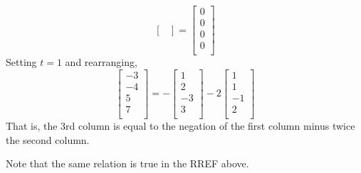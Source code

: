 \documentclass{article}
\begin{document}
\begin{example}
\[\begin{bmatrix}
      \end{bmatrix} =
      \begin{bmatrix}
        0\\0\\0\\0\\
      \end{bmatrix}
    \]
    Setting $t = 1$ and rearranging,
    \[
      \begin{bmatrix}
        -3\\-4\\5\\7\\
      \end{bmatrix} = -
      \begin{bmatrix}
        1\\2\\-3\\3\\
      \end{bmatrix}  - 2
      \begin{bmatrix}
        1\\1\\-1\\2\\
      \end{bmatrix}
    \]
    That is, the 3rd column is equal to the negation of the first column minus twice the second column.

    Note that the same relation is true in the RREF above.


\end{example}
\end{document}
